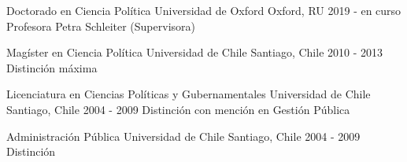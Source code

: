 





\begin{cventries}

\vspace{0.5mm}
\cventry
{Doctorado en Ciencia Política} 
{Universidad de Oxford} 
{Oxford, RU} 
{2019 - en curso} 
{Profesora Petra Schleiter (Supervisora)} \vspace{1.5mm}

\cventry
{Magíster en Ciencia Política} 
{Universidad de Chile} 
{Santiago, Chile} 
{2010 - 2013} 
{Distinción máxima} \vspace{1.5mm}

\cventry
{Licenciatura en Ciencias Políticas y Gubernamentales} 
{Universidad de Chile} 
{Santiago, Chile} 
{2004 - 2009} 
{Distinción con mención en Gestión Pública} \vspace{1.5mm}

\cventry
{Administración Pública} 
{Universidad de Chile} 
{Santiago, Chile} 
{2004 - 2009} 
{Distinción}\vspace{1.5mm}

\end{cventries}
